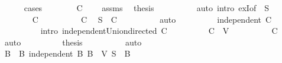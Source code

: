 \begin{isabellebody}
\ \ \ \ \isamarkupfalse%
\ cases\isanewline
\ \ \ \ \ \ \isamarkupfalse%
\ {\isachardoublequoteopen}C\ {\isacharequal}{\kern0pt}\ {\isacharbraceleft}{\kern0pt}{\isacharbraceright}{\kern0pt}{\isachardoublequoteclose}\ \isamarkupfalse%
\ assms\ \isamarkupfalse%
\ {\isacharquery}{\kern0pt}thesis\isanewline
\ \ \ \ \ \ \ \ \isamarkupfalse%
\ {\isacharparenleft}{\kern0pt}auto\ intro{\isacharbang}{\kern0pt}{\isacharcolon}{\kern0pt}\ exI{\isacharbrackleft}{\kern0pt}of\ {\isacharunderscore}{\kern0pt}\ S{\isacharbrackright}{\kern0pt}{\isacharparenright}{\kern0pt}\isanewline
\ \ \ \ \isamarkupfalse%
\isanewline
\ \ \ \ \ \ \isamarkupfalse%
\ {\isachardoublequoteopen}C\ {\isasymnoteq}\ {\isacharbraceleft}{\kern0pt}{\isacharbraceright}{\kern0pt}{\isachardoublequoteclose}\isanewline
\ \ \ \ \ \ \isamarkupfalse%
\ C{\isacharparenleft}{\kern0pt}{}{\isacharparenright}{\kern0pt}\ \isamarkupfalse%
\ {\isachardoublequoteopen}S\ {\isasymsubseteq}\ {\isasymUnion}C{\isachardoublequoteclose}\isanewline
\ \ \ \ \ \ \ \ \isamarkupfalse%
\ auto\isanewline
\ \ \ \ \ \ \isamarkupfalse%
\ \isamarkupfalse%
\ {\isachardoublequoteopen}independent\ {\isacharparenleft}{\kern0pt}{\isasymUnion}C{\isacharparenright}{\kern0pt}{\isachardoublequoteclose}\isanewline
\ \ \ \ \ \ \ \ \isamarkupfalse%
\ {\isacharparenleft}{\kern0pt}intro\ independent{\isacharunderscore}{\kern0pt}Union{\isacharunderscore}{\kern0pt}directed\ C{\isacharparenright}{\kern0pt}\isanewline
\ \ \ \ \ \ \isamarkupfalse%
\ \isamarkupfalse%
\ {\isachardoublequoteopen}{\isasymUnion}C\ {\isasymsubseteq}\ V{\isachardoublequoteclose}\isanewline
\ \ \ \ \ \ \ \ \isamarkupfalse%
\ C\ \isamarkupfalse%
\ auto\isanewline
\ \ \ \ \ \ \isamarkupfalse%
\ \isamarkupfalse%
\ {\isacharquery}{\kern0pt}thesis\isanewline
\ \ \ \ \ \ \ \ \isamarkupfalse%
\ auto\isanewline
\ \ \ \ \isamarkupfalse%
\isanewline
\ \ \isamarkupfalse%
\isanewline
\ \ \isamarkupfalse%
\ \isamarkupfalse%
\ B\ \ B{\isacharcolon}{\kern0pt}\ {\isachardoublequoteopen}independent\ B{\isachardoublequoteclose}\ {\isachardoublequoteopen}B\ {\isasymsubseteq}\ V{\isachardoublequoteclose}\ {\isachardoublequoteopen}S\ {\isasymsubseteq}\ B{\isachardoublequoteclose}\isanewline

\end{isabellebody}
